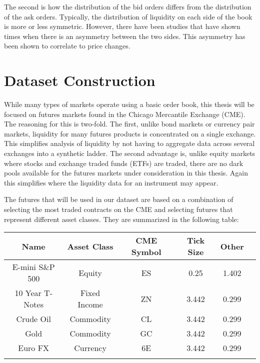 The second is how the distribution of the bid orders differs from the distribution of the ask orders. Typically, the distribution of liquidity on each side of the book is more or less symmetric. However, there have been studies that have shown times when there is an asymmetry between the two sides. This asymmetry has been shown to correlate to price changes. 



\section{Dataset Construction}

While many types of markets operate using a basic order book, this thesis will be focused on futures markets found in the Chicago Mercantile Exchange (CME). The reasoning for this is two-fold. The first, unlike bond markets or currency pair markets, liquidity for many futures products is concentrated on a single exchange. This simplifies analysis of liquidity by not having to aggregate data across several exchanges into a synthetic ladder. The second advantage is, unlike equity markets where stocks and exchange traded funds (ETFs) are traded, there are no dark pools available for the futures markets under consideration in this thesis. Again this simplifies where the liquidity data for an instrument may appear.

The futures that will be used in our dataset are based on a combination of selecting the most traded contracts on the CME and selecting futures that represent different asset classes. They are summarized in the following table:

\begin{center}
\begin{tabular}{SSSSSS} \toprule
    {Name} & {Asset Class} & {CME Symbol} & {Tick Size} & {Other}  \\ \midrule
    {E-mini S\&P 500}  & {Equity} & {ES} & 0.25 & 1.402  \\
    {10 Year T-Notes}  & {Fixed Income}  & {ZN} & 3.442  & 0.299  \\
    {Crude Oil}  & {Commodity}  & {CL} & 3.442  & 0.299  \\
    {Gold} & {Commodity}  & {GC} & 3.442  & 0.299  \\
    {Euro FX}  & {Currency}  & {6E} & 3.442  & 0.299  \\ \bottomrule
\label{futures}
\end{tabular}
\end{center}

